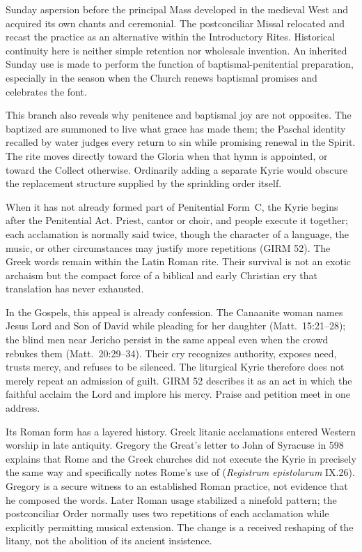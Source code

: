 Sunday aspersion before the principal Mass developed in the medieval West and acquired its own chants and ceremonial. The postconciliar Missal relocated and recast the practice as an alternative within the Introductory Rites. Historical continuity here is neither simple retention nor wholesale invention. An inherited Sunday use is made to perform the function of baptismal-penitential preparation, especially in the season when the Church renews baptismal promises and celebrates the font.

This branch also reveals why penitence and baptismal joy are not opposites. The baptized are summoned to live what grace has made them; the Paschal identity recalled by water judges every return to sin while promising renewal in the Spirit. The rite moves directly toward the Gloria when that hymn is appointed, or toward the Collect otherwise. Ordinarily adding a separate Kyrie would obscure the replacement structure supplied by the sprinkling order itself.


When it has not already formed part of Penitential Form~C, the Kyrie begins after the Penitential Act. Priest, cantor or choir, and people execute it together; each acclamation is normally said twice, though the character of a language, the music, or other circumstances may justify more repetitions (GIRM 52). The Greek words remain within the Latin Roman rite. Their survival is not an exotic archaism but the compact force of a biblical and early Christian cry that translation has never exhausted.

In the Gospels, this appeal is already confession. The Canaanite woman names Jesus Lord and Son of David while pleading for her daughter (Matt.~15:21--28); the blind men near Jericho persist in the same appeal even when the crowd rebukes them (Matt.~20:29--34). Their cry recognizes authority, exposes need, trusts mercy, and refuses to be silenced. The liturgical Kyrie therefore does not merely repeat an admission of guilt. GIRM 52 describes it as an act in which the faithful acclaim the Lord and implore his mercy. Praise and petition meet in one address.

Its Roman form has a layered history. Greek litanic acclamations entered Western worship in late antiquity. Gregory the Great's letter to John of Syracuse in 598 explains that Rome and the Greek churches did not execute the Kyrie in precisely the same way and specifically notes Rome's use of  (\emph{Registrum epistolarum} IX.26). Gregory is a secure witness to an established Roman practice, not evidence that he composed the words. Later Roman usage stabilized a ninefold pattern; the postconciliar Order normally uses two repetitions of each acclamation while explicitly permitting musical extension. The change is a received reshaping of the litany, not the abolition of its ancient insistence.

